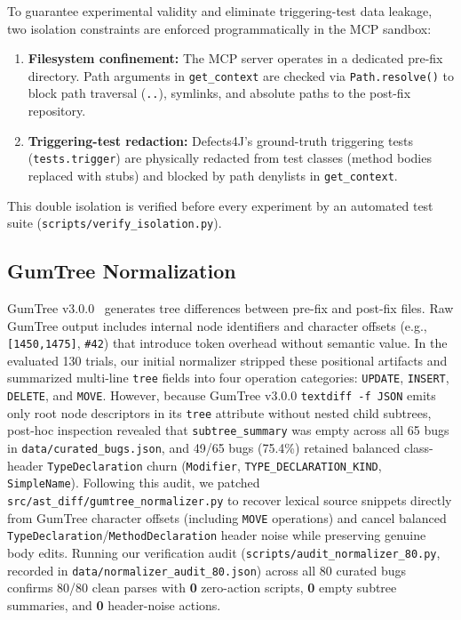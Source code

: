 \documentclass[12pt, a4paper]{article}
\begin{document}
To guarantee experimental validity and eliminate triggering-test data leakage, two isolation constraints are enforced programmatically in the MCP sandbox:
\begin{enumerate}[leftmargin=*]
  \item \textbf{Filesystem confinement:} The MCP server operates in a dedicated pre-fix directory. Path arguments in \texttt{get\_context} are checked via \texttt{Path.resolve()} to block path traversal (\texttt{..}), symlinks, and absolute paths to the post-fix repository.
  \item \textbf{Triggering-test redaction:} Defects4J's ground-truth triggering tests (\texttt{tests.trigger}) are physically redacted from test classes (method bodies replaced with stubs) and blocked by path denylists in \texttt{get\_context}.
\end{enumerate}
This double isolation is verified before every experiment by an automated test suite (\texttt{scripts/verify\_isolation.py}).

\subsection{GumTree Normalization}\label{sec:gumtree}

GumTree v3.0.0~\citep{falleri2014fine} generates tree differences between pre-fix and post-fix files.
Raw GumTree output includes internal node identifiers and character offsets (e.g., \texttt{[1450,1475]}, \texttt{\#42}) that introduce token overhead without semantic value.
In the evaluated 130 trials, our initial normalizer stripped these positional artifacts and summarized multi-line \texttt{tree} fields into four operation categories: \texttt{UPDATE}, \texttt{INSERT}, \texttt{DELETE}, and \texttt{MOVE}.
However, because GumTree v3.0.0 \texttt{textdiff -f JSON} emits only root node descriptors in its \texttt{tree} attribute without nested child subtrees, post-hoc inspection revealed that \texttt{subtree\_summary} was empty across all 65 bugs in \texttt{data/curated\_bugs.json}, and 49/65 bugs (75.4\%) retained balanced class-header \texttt{TypeDeclaration} churn (\texttt{Modifier}, \texttt{TYPE\_DECLARATION\_KIND}, \texttt{SimpleName}).
Following this audit, we patched \texttt{src/ast\_diff/gumtree\_normalizer.py} to recover lexical source snippets directly from GumTree character offsets (including \texttt{MOVE} operations) and cancel balanced \texttt{TypeDeclaration}/\texttt{MethodDeclaration} header noise while preserving genuine body edits.
Running our verification audit (\texttt{scripts/audit\_normalizer\_80.py}, recorded in \texttt{data/normalizer\_audit\_80.json}) across all 80 curated bugs confirms 80/80 clean parses with \textbf{0} zero-action scripts, \textbf{0} empty subtree summaries, and \textbf{0} header-noise actions.
\end{document}
